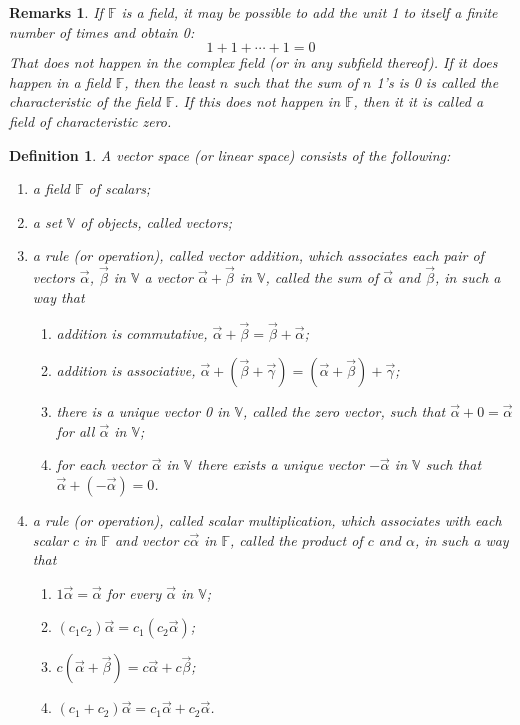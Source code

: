 \documentclass{article}
\newtheorem*{remarks}{Remarks}
\newtheorem*{definition}{Definition}
\begin{document}
    \begin{remarks}
        If \(\mathbb{F}\) is a field, it may be possible to add the unit 1 to itself
        a finite number of times and obtain 0: \[1+1+\cdots+1=0\] That does not happen in
        the complex field (or in any subfield thereof). If it does happen in a field \(\mathbb{F}\),
        then the least \(n\) such that the sum of \(n\) 1's is 0 is called the characteristic
        of the field \(\mathbb{F}\). If this does not happen in \(\mathbb{F}\), then it it
        is called a field of characteristic zero.
    \end{remarks}
    \begin{definition}
        A vector space (or linear space) consists of the following:
        \begin{enumerate}
            \item a field \(\mathbb{F}\) of scalars;
            \item a set \(\mathbb{V}\) of objects, called vectors;
            \item a rule (or operation), called vector addition, which associates each pair of vectors \(\vec{\alpha}\), \(\vec{\beta}\) in \(\mathbb{V}\) a vector \(\vec{\alpha}+\vec{\beta}\) in \(\mathbb{V}\), called the sum of \(\vec{\alpha}\) and \(\vec{\beta}\), in such a way that
            \begin{enumerate}
                \item addition is commutative, \(\vec{\alpha}+\vec{\beta}=\vec{\beta}+\vec{\alpha}\);
                \item addition is associative, \(\vec{\alpha}+(\vec{\beta}+\vec{\gamma})=(\vec{\alpha}+\vec{\beta})+\vec{\gamma}\);
                \item there is a unique vector 0 in \(\mathbb{V}\), called the zero vector, such that \(\vec{\alpha}+0=\vec{\alpha}\) for all \(\vec{\alpha}\) in \(\mathbb{V}\);
                \item for each vector \(\vec{\alpha}\) in \(\mathbb{V}\) there exists a unique vector \(-\vec{\alpha}\) in \(\mathbb{V}\) such that \(\vec{\alpha}+(-\vec{\alpha})=0\).
            \end{enumerate}
            \item a rule (or operation), called scalar multiplication, which associates with each scalar \(c\) in \(\mathbb{F}\) and vector \(c\vec{\alpha}\) in \(\mathbb{F}\), called the product of \(c\) and \(\alpha\), in such a way that
            \begin{enumerate}
                \item \(1\vec{\alpha}=\vec{\alpha}\) for every \(\vec{\alpha}\) in \(\mathbb{V}\);
                \item \((c_1c_2)\vec{\alpha}=c_1(c_2 \vec{\alpha})\);
                \item \(c(\vec{\alpha}+\vec{\beta})=c \vec{\alpha} + c \vec{\beta}\);
                \item \((c_{1}+c_{2})\vec{\alpha} = c_{1} \vec{\alpha} + c_{2} \vec{\alpha}\).
            \end{enumerate}
        \end{enumerate}
    \end{definition}
\end{document}
